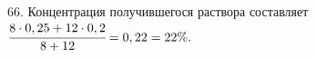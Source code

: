 66. Концентрация получившегося раствора составляет $\cfrac{8\cdot0,25+12\cdot0,2}{8+12}=0,22=22\%.$\\
